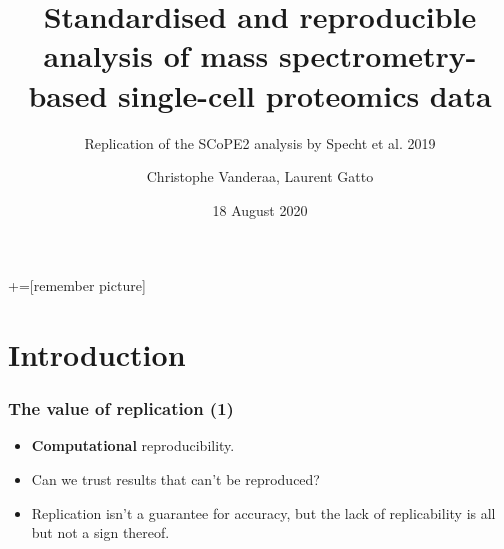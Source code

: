 \documentclass{beamer}
\title{Standardised and reproducible analysis of mass spectrometry-based
single-cell proteomics data}
\subtitle{Replication of the SCoPE2 analysis by Specht et al. 2019}
\author[]{Christophe Vanderaa, Laurent Gatto}
\date{18 August 2020}
\institute[]{Computational Biology Unit (CBIO), de Duve Institute, UCLouvain}
\newcommand{\frametitlesection}[1]{\frametitle{\centering #1 \footnotesize \hspace{0pt plus 1 filll} \insertsection}}
\begin{document}



+=[remember picture]


\begin{frame}[plain]
\titlepage
\end{frame}






\section{Introduction}

\begin{frame}
  \frametitlesection{The value of replication (1)}

  \begin{itemize}
  \item \textbf{Computational} reproducibility.
  \item Can we trust results that can't be reproduced?
  \item Replication isn't a guarantee for accuracy, but the lack
    of replicability is all but not a sign thereof.
  \end{itemize}

\end{frame}
\end{document}
